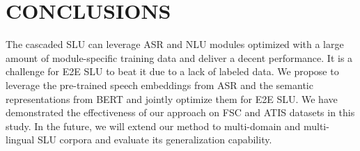 \documentclass{article}
\begin{document}
\section{CONCLUSIONS}
\label{sec:conclusions}

The cascaded SLU can leverage ASR and NLU modules optimized with a large amount of module-specific training data and deliver a decent performance. It is a challenge for E2E SLU to beat it due to a lack of labeled data. We propose to leverage the pre-trained speech embeddings from ASR and the semantic representations from BERT and jointly optimize them for E2E SLU. We have demonstrated the effectiveness of our approach on FSC and ATIS datasets in this study. In the future, we will extend our method to multi-domain and multi-lingual SLU corpora and evaluate its generalization capability.










\end{document}
